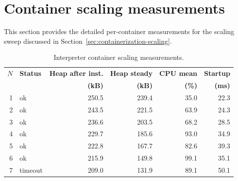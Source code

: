 \documentclass[12pt, a4paper]{report}
\begin{document}
\section{Container scaling measurements}
\label{app:scaling-tables}

This section provides the detailed per-container measurements for the scaling sweep discussed in Section~\ref{sec:containerization-scaling}.

\begin{table}[htbp]
\centering
\small
\begin{tabular}{@{}rlrrrr@{}}
\toprule
\textbf{$N$} & \textbf{Status} & \textbf{Heap after inst.} & \textbf{Heap steady} & \textbf{CPU mean} & \textbf{Startup} \\
 &  & \textbf{(kB)} & \textbf{(kB)} & \textbf{(\%)} & \textbf{(ms)} \\
\midrule
1 & ok      & 250.5 & 239.4 & 35.0 & 22.3 \\
2 & ok      & 243.5 & 221.5 & 63.9 & 24.3 \\
3 & ok      & 236.6 & 203.5 & 68.2 & 28.5 \\
4 & ok      & 229.7 & 185.6 & 93.0 & 34.9 \\
5 & ok      & 222.8 & 167.7 & 82.6 & 39.3 \\
6 & ok      & 215.9 & 149.8 & 99.1 & 35.1 \\
7 & timeout & 209.0 & 131.9 & 89.1 & 50.1 \\
\bottomrule
\end{tabular}
\caption{Interpreter container scaling measurements.}
\label{tab:scaling-interpreter}
\end{table}
\end{document}

